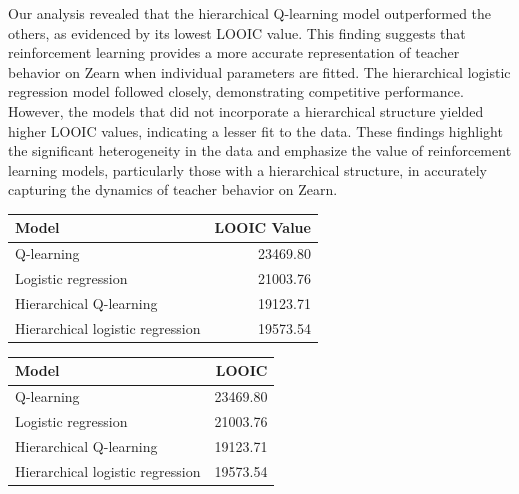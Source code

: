 \documentclass[
  number,
  preprint,
  3p,
  onecolumn]{elsarticle}
\begin{document}
Our analysis revealed that the hierarchical Q-learning model
outperformed the others, as evidenced by its lowest LOOIC value. This
finding suggests that reinforcement learning provides a more accurate
representation of teacher behavior on Zearn when individual parameters
are fitted. The hierarchical logistic regression model followed closely,
demonstrating competitive performance. However, the models that did not
incorporate a hierarchical structure yielded higher LOOIC values,
indicating a lesser fit to the data. These findings highlight the
significant heterogeneity in the data and emphasize the value of
reinforcement learning models, particularly those with a hierarchical
structure, in accurately capturing the dynamics of teacher behavior on
Zearn.

\begin{table}

\caption{\label{tbl-RL-logit-comp}Model comparison using Leave-One-Out
Information Criterion (LOOIC). LOOIC values, a measure of model quality,
were calculated for each model type. Lower values indicate better model
performance. Q-learning models were built using a kernel-based approach.
Hierarchical models incorporate a hierarchical structure to account for
classroom-level variations.}\begin{minipage}[t]{\linewidth}
\subcaption{\label{tbl-RL-logit-comp-1}}

{\centering 

\begin{longtable*}{lr}
\toprule
Model & LOOIC Value \\ 
\midrule
Q-learning & 23469.80 \\ 
Logistic regression & 21003.76 \\ 
Hierarchical Q-learning & 19123.71 \\ 
Hierarchical logistic regression & 19573.54 \\ 
\bottomrule
\end{longtable*}

}

\end{minipage}%
\newline
\begin{minipage}[t]{\linewidth}
\subcaption{\label{tbl-RL-logit-comp-2}}

{\centering 

\begin{longtable*}{lr}
\toprule
Model & LOOIC \\ 
\midrule
Q-learning & 23469.80 \\ 
Logistic regression & 21003.76 \\ 
Hierarchical Q-learning & 19123.71 \\ 
Hierarchical logistic regression & 19573.54 \\ 
\bottomrule
\end{longtable*}

}

\end{minipage}%

\end{table}
\end{document}
